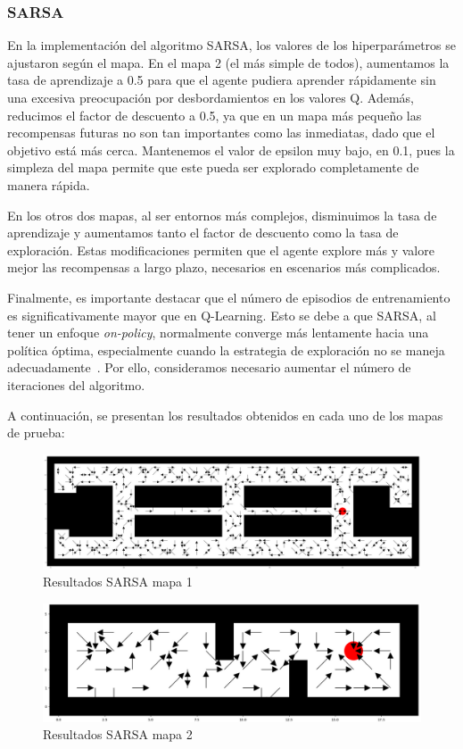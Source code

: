 \documentclass[conference,a4paper]{IEEEtran}
\begin{document}
\subsubsection{\textbf{SARSA}}

En la implementación del algoritmo SARSA, los valores de los hiperparámetros se ajustaron según el mapa. En el mapa 2 (el más simple de todos), aumentamos la tasa de aprendizaje a 0.5 para que el agente pudiera aprender rápidamente sin una excesiva preocupación por desbordamientos en los valores Q.
Además, reducimos el factor de descuento a 0.5, ya que en un mapa más pequeño las recompensas futuras no son tan importantes como las inmediatas, dado que el objetivo está más cerca.
Mantenemos el valor de epsilon muy bajo, en 0.1, pues la simpleza del mapa permite que este pueda ser explorado completamente de manera rápida.

En los otros dos mapas, al ser entornos más complejos, disminuimos la tasa de aprendizaje y aumentamos tanto el factor de descuento como la tasa de exploración. Estas modificaciones permiten que el agente explore más y valore mejor las recompensas a largo plazo, necesarios en escenarios más complicados.

Finalmente, es importante destacar que el número de episodios de entrenamiento es significativamente mayor que en Q-Learning. Esto se debe a que SARSA, al tener un enfoque \textit{on-policy}, normalmente converge más lentamente hacia una política óptima, especialmente cuando la estrategia de exploración no se 
maneja adecuadamente~\cite{b4}. Por ello, consideramos necesario aumentar el número de iteraciones del algoritmo.

A continuación, se presentan los resultados obtenidos en cada uno de los mapas de prueba:

\begin{figure}[h]
  \centering
  \includegraphics[scale=0.33]{resultado_sarsa_mapa_1}
  \caption{Resultados SARSA mapa 1}
  \label{fig:resultado_sarsa_mapa_1}
\end{figure}

\begin{figure}[h]
  \centering
  \includegraphics[scale=0.33]{resultado_sarsa_mapa_2}
  \caption{Resultados SARSA mapa 2}
  \label{fig:resultado_sarsa_mapa_2}
\end{figure}
\end{document}
